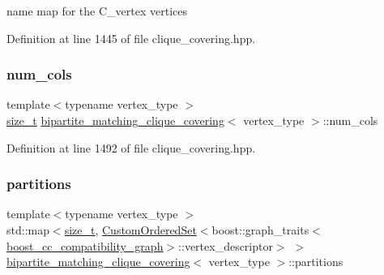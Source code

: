 name map for the C\+\_\+vertex vertices 



Definition at line 1445 of file clique\+\_\+covering.\+hpp.

\mbox{\label{classbipartite__matching__clique__covering_a8b9b5e4093ca3e406f86871dc565faf6}} 
\subsubsection{\texorpdfstring{num\+\_\+cols}{num\_cols}}
{\footnotesize\ttfamily template$<$typename vertex\+\_\+type $>$ \\
\hyperlink{tutorial__fpt__2017_2intro_2sixth_2test_8c_a7c94ea6f8948649f8d181ae55911eeaf}{size\+\_\+t} \hyperlink{classbipartite__matching__clique__covering}{bipartite\+\_\+matching\+\_\+clique\+\_\+covering}$<$ vertex\+\_\+type $>$\+::num\+\_\+cols\hspace{0.3cm}{\ttfamily [private]}}



Definition at line 1492 of file clique\+\_\+covering.\+hpp.

\mbox{\label{classbipartite__matching__clique__covering_a9d06b88dae787e1e26a95783ac0999cb}} 
\subsubsection{\texorpdfstring{partitions}{partitions}}
{\footnotesize\ttfamily template$<$typename vertex\+\_\+type $>$ \\
std\+::map$<$\hyperlink{tutorial__fpt__2017_2intro_2sixth_2test_8c_a7c94ea6f8948649f8d181ae55911eeaf}{size\+\_\+t}, \hyperlink{classCustomOrderedSet}{Custom\+Ordered\+Set}$<$boost\+::graph\+\_\+traits$<$\hyperlink{clique__covering__graph_8hpp_af47b1c28cf9a2c360afafb8d80582ce6}{boost\+\_\+cc\+\_\+compatibility\+\_\+graph}$>$\+::vertex\+\_\+descriptor$>$ $>$ \hyperlink{classbipartite__matching__clique__covering}{bipartite\+\_\+matching\+\_\+clique\+\_\+covering}$<$ vertex\+\_\+type $>$\+::partitions\hspace{0.3cm}{\ttfamily [private]}}



